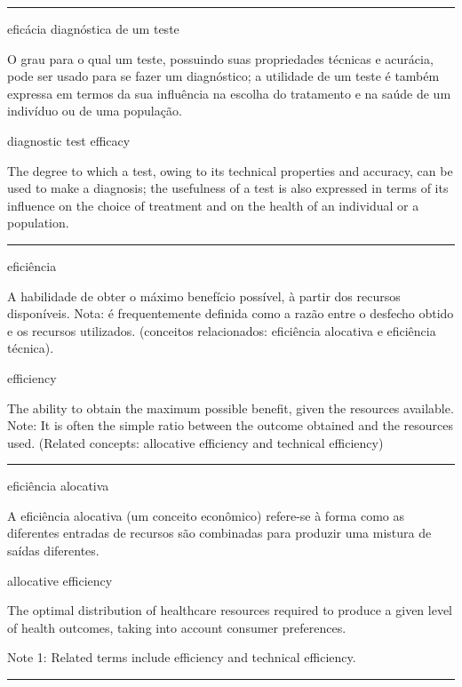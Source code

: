 \documentclass[
  openany]{book}
\begin{document}
\begin{center}\rule{0.5\linewidth}{0.5pt}\end{center}

eficácia diagnóstica de um teste

O grau para o qual um teste, possuindo suas propriedades técnicas e acurácia, pode ser usado para se fazer um diagnóstico; a utilidade de um teste é também expressa em termos da sua influência na escolha do tratamento e na saúde de um indivíduo ou de uma população.

diagnostic test efficacy

The degree to which a test, owing to its technical properties and accuracy, can be used to make a diagnosis; the usefulness of a test is also expressed in terms of its influence on the choice of treatment and on the health of an individual or a population.

\begin{center}\rule{0.5\linewidth}{0.5pt}\end{center}

eficiência

A habilidade de obter o máximo benefício possível, à partir dos recursos disponíveis. Nota: é frequentemente definida como a razão entre o desfecho obtido e os recursos utilizados. (conceitos relacionados: eficiência alocativa e eficiência técnica).

efficiency

The ability to obtain the maximum possible benefit, given the resources available. Note: It is often the simple ratio between the outcome obtained and the resources used. (Related concepts: allocative efficiency and technical efficiency)

\begin{center}\rule{0.5\linewidth}{0.5pt}\end{center}

eficiência alocativa

A eficiência alocativa (um conceito econômico) refere-se à forma como as diferentes entradas de recursos são combinadas para produzir uma mistura de saídas diferentes.

allocative efficiency

The optimal distribution of healthcare resources required to produce a given level of health outcomes, taking into account consumer preferences.

Note 1: Related terms include efficiency and technical efficiency.

\begin{center}\rule{0.5\linewidth}{0.5pt}\end{center}
\end{document}
